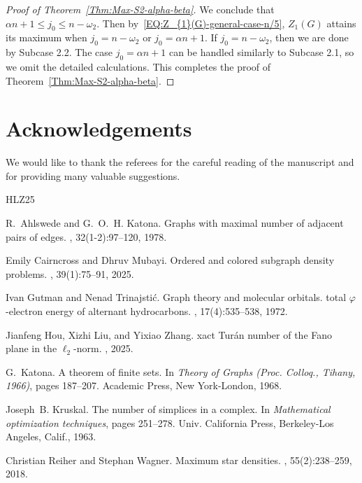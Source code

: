 \documentclass[11pt,a4paper]{article}
\begin{document}
\begin{proof}[Proof of Theorem~\ref{Thm:Max-S2-alpha-beta}]
We conclude that $\alpha n+1 \le j_0 \le n - \omega_2$. 
Then by~\eqref{EQ:Z_{1}(G)-general-case-n/5}, $Z_{1}(G)$ attains its maximum when $j_0 = n - \omega_2$ or $j_0 = \alpha n+1$. 
If $j_0 = n - \omega_2$, then we are done by Subcase 2.2. 
The case $j_0 = \alpha n+1$ can be handled similarly to Subcase 2.1, so we omit the detailed calculations. 
This completes the proof of Theorem~\ref{Thm:Max-S2-alpha-beta}. 
\end{proof}

\section*{Acknowledgements}
We would like to thank the referees for the careful reading of the manuscript and for providing many valuable suggestions. 



\begin{thebibliography}{HLZ25}

R.~Ahlswede and G.~O.~H. Katona.
\newblock Graphs with maximal number of adjacent pairs of edges.
, 32(1-2):97--120, 1978.

Emily Cairncross and Dhruv Mubayi.
\newblock Ordered and colored subgraph density problems.
, 39(1):75--91, 2025.

Ivan Gutman and Nenad Trinajsti{\'c}.
\newblock Graph theory and molecular orbitals. total $\varphi$-electron energy
  of alternant hydrocarbons.
, 17(4):535--538, 1972.

Jianfeng Hou, Xizhi Liu, and Yixiao Zhang.
xact {T}ur{\'{a}}n number of the {F}ano plane in the
  $\ell_2$-norm. 
, 2025.

G.~Katona.
\newblock A theorem of finite sets.
\newblock In {\em Theory of {G}raphs ({P}roc. {C}olloq., {T}ihany, 1966)}, pages 187--207. Academic Press, New York-London, 1968.

Joseph~B. Kruskal.
\newblock The number of simplices in a complex.
\newblock In {\em Mathematical optimization techniques}, pages 251--278. Univ.
  California Press, Berkeley-Los Angeles, Calif., 1963.

Christian Reiher and Stephan Wagner.
\newblock Maximum star densities.
, 55(2):238--259, 2018.

\end{thebibliography}
\end{document}
